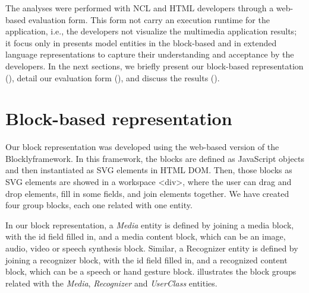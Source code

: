 
The analyses were performed with NCL and HTML developers through a web-based
evaluation form. This form not carry an execution runtime for the application,
i.e., the developers not visualize the multimedia application results; it focus
only in presents model entities in the block-based and in extended language
representations to capture their understanding and acceptance by the
developers. In the next sections, we briefly present our block-based
representation (), detail our evaluation form
(), and discuss the results
().

\section{Block-based representation}
\label{sec:evaluation:blocks}

Our block representation was developed using the web-based version of the
Blockly\footnotemark framework. In this framework, the blocks are defined as
JavaScript
objects and then instantiated as SVG elements in HTML DOM. Then, those blocks as
SVG elements are showed in a workspace <div>, where the user can drag and drop
elements, fill in some fields, and join elements together. We have created four
group blocks, each one related with one entity.


In our block representation, a \textit{Media} entity is defined by joining a
media block, with the id field filled in, and a media content block, which can
be an image, audio, video or speech synthesis block. Similar, a Recognizer
entity is defined by joining a recognizer block, with the id field filled in,
and a recognized content block, which can be a speech or hand gesture block.
 illustrates the block groups related with the
\textit{Media},
\textit{Recognizer} and
\textit{UserClass} entities.

